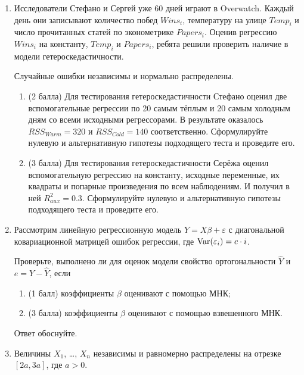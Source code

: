 \begin{enumerate}
    \item Исследователи Стефано и Сергей уже 60 дней играют в Overwatch. 
    Каждый день они записывают количество побед $Wins_i$, температуру на улице $Temp_i$ и число прочитанных статей по эконометрике $Papers_i$. 
    Оценив регрессию $Wins_i$ на константу, $Temp_i$ и $Papers_i$, ребята решили проверить наличие в модели гетероскедастичности. 
    
    Случайные ошибки независимы и нормально распределены. 
    
    \begin{enumerate}
        \item (2 балла) Для тестирования гетероскедастичности Стефано оценил две вспомогательные регрессии по 20 самым тёплым и 20 самым холодным дням со всеми исходными регрессорами. 
        В результате оказалось $RSS_{Warm} = 320$ и $RSS_{Cold} = 140$ соответственно. 
        Сформулируйте нулевую и альтернативную гипотезы подходящего теста и проведите его.
        \item (3 балла) Для тестирования гетероскедастичности Серёжа оценил вспомогательную регрессию на константу, 
        исходные переменные, их квадраты и попарные произведения по всем наблюдениям. 
        И получил в ней $R^2_{aux} = 0.3$. 
        Сформулируйте нулевую и альтернативную гипотезы подходящего теста и проведите его.
    \end{enumerate}
    
    
    \item Рассмотрим линейную регрессионную модель 
    $Y  = X\beta + \varepsilon$
    с диагональной ковариационной матрицей ошибок регрессии, где $\operatorname{Var}(\varepsilon_i) = c \cdot i$.
   
   Проверьте, выполнено ли для оценок модели свойство ортогональности $\hat Y$  и  $e = Y - \hat Y$, если
   \begin{enumerate}
       \item (1 балл) коэффициенты $\beta$ оценивают с помощью МНК;
       \item (3 балла) коэффициенты $\beta$ оценивают с помощью взвешенного МНК.
   \end{enumerate}
   
   Ответ обоснуйте.
    
    \item Величины $X_1$, \ldots, $X_n$ независимы и равномерно распределены на отрезке $[2a, 3a]$, где $a > 0$.
    

\end{enumerate}
